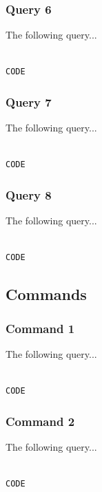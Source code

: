 \documentclass{article}
\begin{document}
\subsubsection{Query 6}
The following query...

\begin{lstlisting}[language=cypher, label=lst:cypher-example]

CODE

\end{lstlisting}
\subsubsection{Query 7}
The following query...

\begin{lstlisting}[language=cypher, label=lst:cypher-example]

CODE

\end{lstlisting}
\subsubsection{Query 8}
The following query...

\begin{lstlisting}[language=cypher, label=lst:cypher-example]

CODE

\end{lstlisting}
\newpage
\subsection{Commands}
\subsubsection{Command 1}
The following query...

\begin{lstlisting}[language=cypher, label=lst:cypher-example]

CODE

\end{lstlisting}
\subsubsection{Command 2}
The following query...

\begin{lstlisting}[language=cypher, label=lst:cypher-example]

CODE

\end{lstlisting}
\newpage
\end{document}
